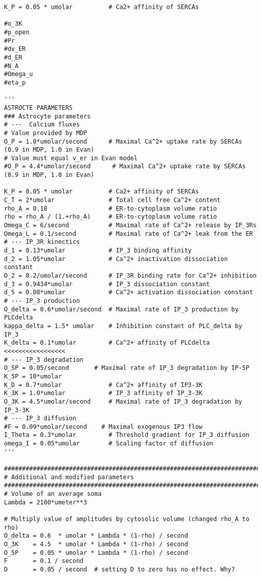 \documentclass{article}
\begin{document}
\begin{verbatim}
K_P = 0.05 * umolar          # Ca2+ affinity of SERCAs

#o_3K
#p_open
#Pr
#dv_ER
#d_ER
#N_A
#Omega_u
#eta_p

'''
ASTROCTE PARAMETERS
### Astrocyte parameters
# ---  Calcium fluxes
# Value provided by MDP
O_P = 1.0*umolar/second      # Maximal Ca^2+ uptake rate by SERCAs  (0.9 in MDP, 1.0 in Evan)
# Value must equal v_er in Evan model
#O_P = 4.4*umolar/second      # Maximal Ca^2+ uptake rate by SERCAs  (0.9 in MDP, 1.0 in Evan)

K_P = 0.05 * umolar          # Ca2+ affinity of SERCAs
C_T = 2*umolar               # Total cell free Ca^2+ content
rho_A = 0.18                 # ER-to-cytoplasm volume ratio
rho = rho_A / (1.+rho_A)     # ER-to-cytoplasm volume ratio
Omega_C = 6/second           # Maximal rate of Ca^2+ release by IP_3Rs
Omega_L = 0.1/second         # Maximal rate of Ca^2+ leak from the ER
# --- IP_3R kinectics
d_1 = 0.13*umolar            # IP_3 binding affinity
d_2 = 1.05*umolar            # Ca^2+ inactivation dissociation constant
O_2 = 0.2/umolar/second      # IP_3R binding rate for Ca^2+ inhibition
d_3 = 0.9434*umolar          # IP_3 dissociation constant
d_5 = 0.08*umolar            # Ca^2+ activation dissociation constant
# --- IP_3 production
O_delta = 0.6*umolar/second  # Maximal rate of IP_3 production by PLCdelta
kappa_delta = 1.5* umolar    # Inhibition constant of PLC_delta by IP_3
K_delta = 0.1*umolar         # Ca^2+ affinity of PLCdelta   <<<<<<<<<<<<<<<<<
# --- IP_3 degradation
O_5P = 0.05/second       # Maximal rate of IP_3 degradation by IP-5P
K_5P = 10*umolar
K_D = 0.7*umolar             # Ca^2+ affinity of IP3-3K
K_3K = 1.0*umolar            # IP_3 affinity of IP_3-3K
O_3K = 4.5*umolar/second     # Maximal rate of IP_3 degradation by IP_3-3K
# --- IP_3 diffusion
#F = 0.09*umolar/second    # Maximal exogenous IP3 flow
I_Theta = 0.3*umolar         # Threshold gradient for IP_3 diffusion
omega_I = 0.05*umolar        # Scaling factor of diffusion
'''

################################################################################
# Additional and modified parameters
################################################################################
# Volume of an average soma
Lambda = 2100*umeter**3

# Multiply value of amplitudes by cytosolic volume (changed rho_A to rho)
O_delta = 0.6  * umolar * Lambda * (1-rho) / second
O_3K    = 4.5  * umolar * Lambda * (1-rho) / second
O_5P    = 0.05 * umolar * Lambda * (1-rho) / second
F       = 0.1 / second
D       = 0.05 / second  # setting D to zero has no effect. Why?


\end{verbatim}
\end{document}
